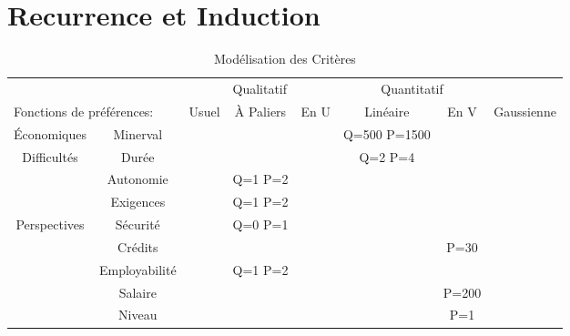 \chapter{Recurrence et Induction}\label{sec:recurenceinduction}

\begin{table}[h!]
	\begin{center}
		\caption{Modélisation des Critères}
		\label{tbl:modélisation}
		\begin{tabular}{c|c|cccccc}
			\toprule
			\multicolumn{2}{c}{\slashbox{Critères}{Échelles}}&\multicolumn{3}{c}{Qualitatif} & \multicolumn{2}{c}{Quantitatif} & \\
			\cmidrule(lr){3-5} \cmidrule(lr){6-7}
			\multicolumn{2}{l}{Fonctions de préférences:}  & Usuel & À Paliers & En U & Linéaire & En V & Gaussienne\\
			\cmidrule(lr){3-3}\cmidrule(lr){4-4}\cmidrule(lr){5-5}\cmidrule(lr){6-6}\cmidrule(lr){7-7}\cmidrule(lr){8-8}
			\cmidrule{1-2}
			\multirow{1}{*}{Économiques}
			& Minerval		&   &          &   & Q=500 P=1500 &       & \\
            \cmidrule{1-2} \cmidrule(lr){3-3}\cmidrule(lr){4-4}\cmidrule(lr){5-5}\cmidrule(lr){6-6}\cmidrule(lr){7-7}\cmidrule(lr){8-8}
			\multirow{3}{*}{Difficultés} 
			& Durée 		&   &          &   & Q=2 P=4      &       & \\
			& Autonomie  	&   & Q=1 P=2  &   &              &       & \\
			& Exigences 	&   & Q=1 P=2  &   &              &       & \\
            \cmidrule{1-2} \cmidrule(lr){3-3}\cmidrule(lr){4-4}\cmidrule(lr){5-5}\cmidrule(lr){6-6}\cmidrule(lr){7-7}\cmidrule(lr){8-8}
			\multirow{5}{*}{Perspectives} 
			& Sécurité 		&   & Q=0 P=1  &   &              &       & \\
			& Crédits 		&   &          &   &              & P=30  & \\
			& Employabilité &   & Q=1 P=2  &   &              &       & \\
			& Salaire 		&   &          &   &              & P=200 & \\
			& Niveau 		&   &          &   &              & P=1   & \\
			\bottomrule
		\end{tabular}
	\end{center}
\end{table}


